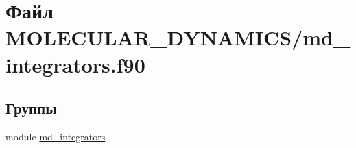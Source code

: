 \hypertarget{md__integrators_8f90}{}\section{Файл M\+O\+L\+E\+C\+U\+L\+A\+R\+\_\+\+D\+Y\+N\+A\+M\+I\+C\+S/md\+\_\+integrators.f90}
\label{md__integrators_8f90}
\subsection*{Группы}
\begin{DoxyCompactItemize}
\item 
module \mbox{\hyperlink{namespacemd__integrators}{md\+\_\+integrators}}
\end{DoxyCompactItemize}
